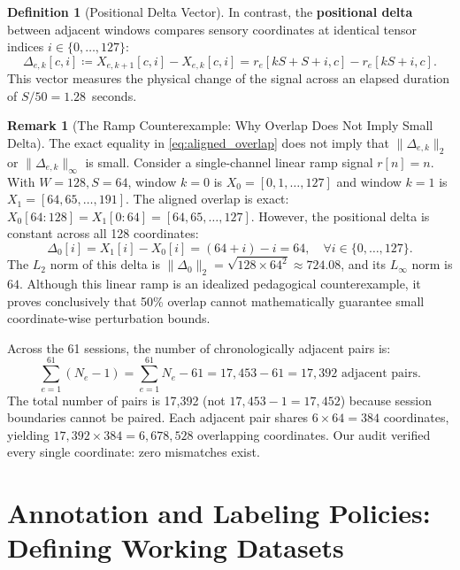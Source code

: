 \documentclass[11pt,a4paper]{article}
\theoremstyle{definition}
\newtheorem{definition}[proposition]{Definition}
\newtheorem{remark}[proposition]{Remark}
\begin{document}
\begin{definition}[Positional Delta Vector]
In contrast, the \textbf{positional delta} between adjacent windows compares sensory coordinates at identical tensor indices $i \in \{0, \ldots, 127\}$:
\begin{equation}\label{eq:positional_delta}
\Delta_{e,k}[c, i] \coloneqq X_{e,k+1}[c, i] - X_{e,k}[c, i] = r_e[kS + S + i, c] - r_e[kS + i, c].
\end{equation}
This vector measures the physical change of the signal across an elapsed duration of $S/50 = 1.28$~seconds.
\end{definition}

\begin{remark}[The Ramp Counterexample: Why Overlap Does Not Imply Small Delta]
The exact equality in \eqref{eq:aligned_overlap} does not imply that $\|\Delta_{e,k}\|_2$ or $\|\Delta_{e,k}\|_\infty$ is small. Consider a single-channel linear ramp signal $r[n] = n$. With $W=128, S=64$, window $k=0$ is $X_0 = [0, 1, \ldots, 127]$ and window $k=1$ is $X_1 = [64, 65, \ldots, 191]$. The aligned overlap is exact: $X_0[64:128] = X_1[0:64] = [64, 65, \ldots, 127]$. However, the positional delta is constant across all 128 coordinates:
\begin{equation*}
\Delta_0[i] = X_1[i] - X_0[i] = (64 + i) - i = 64, \quad \forall i \in \{0, \ldots, 127\}.
\end{equation*}
The $L_2$ norm of this delta is $\|\Delta_0\|_2 = \sqrt{128 \times 64^2} \approx 724.08$, and its $L_\infty$ norm is $64$. Although this linear ramp is an idealized pedagogical counterexample, it proves conclusively that 50\% overlap cannot mathematically guarantee small coordinate-wise perturbation bounds.
\end{remark}

Across the 61 sessions, the number of chronologically adjacent pairs is:
\begin{equation}
\sum_{e=1}^{61} (N_e - 1) = \sum_{e=1}^{61} N_e - 61 = 17,453 - 61 = 17,392\text{ adjacent pairs}.
\end{equation}
The total number of pairs is 17,392 (not $17,453 - 1 = 17,452$) because session boundaries cannot be paired. Each adjacent pair shares $6 \times 64 = 384$ coordinates, yielding $17,392 \times 384 = 6,678,528$ overlapping coordinates. Our audit verified every single coordinate: zero mismatches exist.

\section{Annotation and Labeling Policies: Defining Working Datasets}
\end{document}
